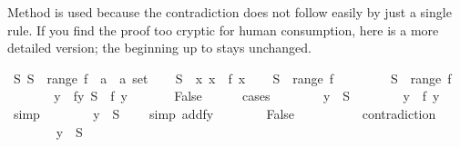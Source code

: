 \begin{isabellebody}
\begin{isamarkuptext}
Method  is used because the contradiction does not follow easily
by just a single rule. If you find the proof too cryptic for human
consumption, here is a more detailed version; the beginning up to
 stays unchanged.%
\end{isamarkuptext}%
\isamarkuptrue%
\isamarkupfalse%
\ {\isachardoublequoteopen}{\isasymexists}S{\isachardot}\ S\ {\isasymnotin}\ range\ {\isacharparenleft}f\ {\isacharcolon}{\isacharcolon}\ {\isacharprime}a\ {\isasymRightarrow}\ {\isacharprime}a\ set{\isacharparenright}{\isachardoublequoteclose}\isanewline
%
\isadelimproof
%
\endisadelimproof
%
\isatagproof
{}\isamarkupfalse%
\isanewline
\ \ \isamarkupfalse%
\ {\isacharquery}S\ {\isacharequal}\ {\isachardoublequoteopen}{\isacharbraceleft}x{\isachardot}\ x\ {\isasymnotin}\ f\ x{\isacharbraceright}{\isachardoublequoteclose}\isanewline
\ \ \isamarkupfalse%
\ {\isachardoublequoteopen}{\isacharquery}S\ {\isasymnotin}\ range\ f{\isachardoublequoteclose}\isanewline
\ \ \isamarkupfalse%
\isanewline
\ \ \ \ \isamarkupfalse%
\ {\isachardoublequoteopen}{\isacharquery}S\ {\isasymin}\ range\ f{\isachardoublequoteclose}\isanewline
\ \ \ \ \isamarkupfalse%
\ \isamarkupfalse%
\ y\ \ fy{\isacharcolon}\ {\isachardoublequoteopen}{\isacharquery}S\ {\isacharequal}\ f\ y{\isachardoublequoteclose}\ \isacommand{{\isachardot}{\isachardot}}\isamarkupfalse%
\isanewline
\ \ \ \ \isamarkupfalse%
\ False\isanewline
\ \ \ \ \isamarkupfalse%
\ cases\isanewline
\ \ \ \ \ \ \isamarkupfalse%
\ {\isachardoublequoteopen}y\ {\isasymin}\ {\isacharquery}S{\isachardoublequoteclose}\isanewline
\ \ \ \ \ \ \isamarkupfalse%
\ {\isachardoublequoteopen}y\ {\isasymnotin}\ f\ y{\isachardoublequoteclose}\ \ \ \isamarkupfalse%
\ simp\isanewline
\ \ \ \ \ \ \isamarkupfalse%
\ {\isachardoublequoteopen}y\ {\isasymnotin}\ {\isacharquery}S{\isachardoublequoteclose}\ \ \ \ \isamarkupfalse%
{\isacharparenleft}simp\ add{\isacharcolon}fy{\isacharparenright}\isanewline
\ \ \ \ \ \ \isamarkupfalse%
\ False\ \ \ \ \ \ \ \ \ \isamarkupfalse%
\ contradiction\isanewline
\ \ \ \ \isamarkupfalse%
\isanewline
\ \ \ \ \ \ \isamarkupfalse%
\ {\isachardoublequoteopen}y\ {\isasymnotin}\ {\isacharquery}S{\isachardoublequoteclose}\isanewline
\ \ \ \ \ \ \isamarkupfalse%

\end{isabellebody}
